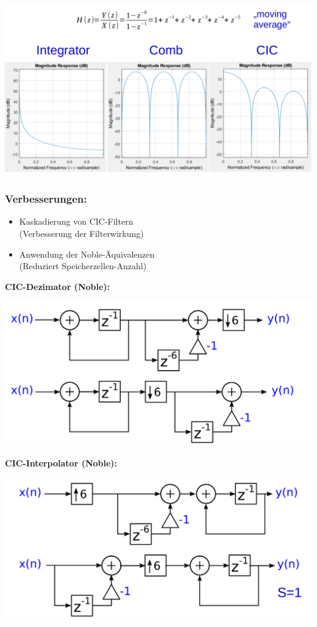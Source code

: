 \documentclass[10pt,a4paper]{article}
\begin{document}
\begin{center}
  \includegraphics[width=.5\textwidth]{./img/Multirate_CIC_Frequenzgang.png}
\end{center} 

\subsubsection{Verbesserungen: }
\begin{itemize}
  \item Kaskadierung von CIC-Filtern \\
  (Verbesserung der Filterwirkung)
  \item Anwendung der Noble-Äquivalenzen\\
   (Reduziert Speicherzellen-Anzahl)
\end{itemize}

\textbf{CIC-Dezimator (Noble): }
\begin{center}
  \includegraphics[width=.4\textwidth]{./img/CIC_Dezimator.png}
\end{center} 

\textbf{CIC-Interpolator (Noble): }
\begin{center}
  \includegraphics[width=.4\textwidth]{./img/CIC_Interpolator.png}
\end{center} 
 
\end{document}
